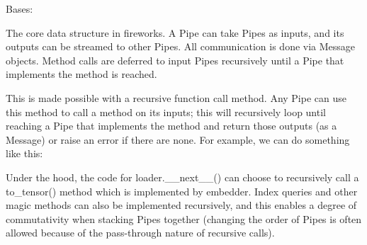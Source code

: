\documentclass[letterpaper,10pt,english]{sphinxmanual}
\begin{document}
\begin{fulllineitems}
\label{\detokenize{Fireworks:Fireworks.core.pipe.Pipe}}
Bases: 

The core data structure in fireworks.
A Pipe can take Pipes as inputs, and its outputs can be streamed to other Pipes.
All communication is done via Message objects.
Method calls are deferred to input Pipes recursively until a Pipe that implements the method is reached.

This is made possible with a recursive function call method. Any Pipe can use this method to call a method on its inputs; this will recursively loop until reaching a Pipe that implements the method and return those outputs (as a Message) or raise an error if there are none. For example, we can do something like this:

%
\begin{sphinxVerbatim}[commandchars=\\\{\}]
  
   
  
  

   
\end{sphinxVerbatim}

Under the hood, the code for loader.\_\_next\_\_() can choose to recursively call a to\_tensor() method which is implemented by embedder. Index queries and other magic methods can also be implemented recursively, and this enables a degree of commutativity when stacking Pipes together (changing the order of Pipes is often allowed because of the pass-through nature of recursive calls).


\end{fulllineitems}
\end{document}
